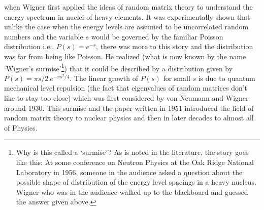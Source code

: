 \documentclass[letter,11pt]{article}
\begin{document}
when Wigner first applied the ideas of random matrix theory 
to understand the energy spectrum in nuclei of heavy elements. It was experimentally 
shown that unlike the case when the energy levels are assumed to be uncorrelated
random numbers and the variable $s$ would be governed by the familiar Poisson distribution 
i.e., $P(s) = e^{-s}$, there was more to this story and the distribution was far from being like Poisson. 
He realized (what is now known by the name `Wigner's surmise'\footnote{Why is this called a `surmise'? 
As is noted in the literature, the story goes like this: At some conference on Neutron Physics at the Oak 
Ridge National Laboratory in 1956, someone in the audience asked a question about the possible shape 
of distribution of the energy level spacings in a heavy nucleus. Wigner who was in the audience 
walked up to the blackboard and guessed the answer given above.}) that it could be described by a distribution given by $P(s) = \pi s/2~e^{-\pi s^2/4}$. 
The linear growth of $P(s)$ for small $s$ is due to quantum mechanical level repulsion (the fact that eigenvalues of random matrices don't like to stay too close)
which was first considered by von Neumann and Wigner around 1930. 
This surmise and the paper written in 1951
\cite{Wigner1951OnTS} introduced the field of random matrix theory 
to nuclear physics and then in later decades to almost all of Physics.
\end{document}

